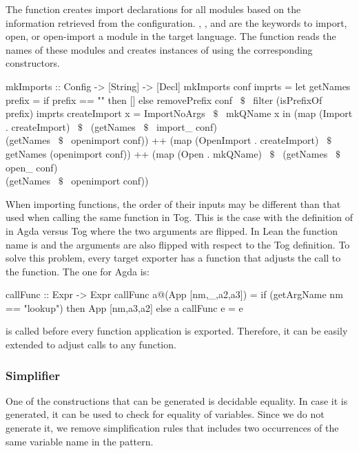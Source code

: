 The function  creates import declarations for all modules based on the information retrieved from the configuration. , , and  are the keywords to import, open, or open-import a module in the target language. The function reads the names of these modules and creates instances of  using the corresponding constructors. 
\begin{hscode}
mkImports :: Config -> [String] -> [Decl]
mkImports conf imprts =
  let getNames prefix =
        if prefix == "" then [] 
        else removePrefix conf ~$\$$~ filter (isPrefixOf prefix) imprts
       createImport x = ImportNoArgs ~$\$$~ mkQName x
  in (map (Import . createImport) ~$\$$~ 
         (getNames ~$\$$~ import_ conf) \\ (getNames ~$\$$~ openimport conf))
  ++ (map (OpenImport . createImport) ~$\$$~ getNames (openimport conf))
  ++ (map (Open . mkQName) ~$\$$~
         (getNames ~$\$$~ open_ conf) \\ (getNames ~$\$$~ openimport conf))
\end{hscode} 

When importing functions, the order of their inputs may be different than that used when calling the same function in Tog. This is the case with the definition of  in Agda versus Tog where the two arguments are flipped. In Lean the function name is  and the arguments are also flipped with respect to the Tog definition. To solve this problem, every target exporter has a function  that adjusts the call to the function. The one for Agda is: 
\begin{hscode}
callFunc :: Expr -> Expr
callFunc a@(App [nm,_,a2,a3]) =
  if (getArgName nm == "lookup") then App [nm,a3,a2] else a
callFunc e = e
\end{hscode}
\noindent {} is called before every function application is exported. Therefore, it can be easily extended to adjust calls to any function. 

\subsubsection{Simplifier}
One of the constructions that can be generated is decidable equality. In case it is generated, it can be used to check for equality of variables. Since we do not generate it, we remove simplification rules that includes two occurrences of the same variable name in the pattern. 


